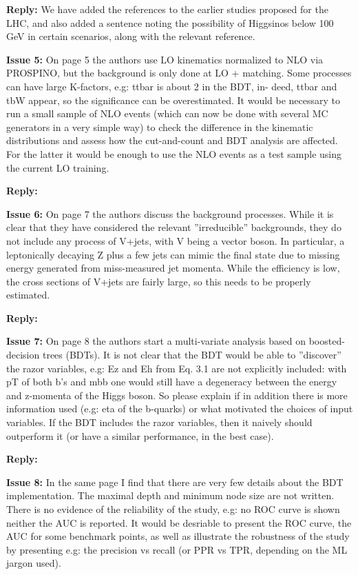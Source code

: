 \documentclass[12pt]{article}
\newcommand{\issue}[1]{\bigskip\noindent\textbf{\color{Maroon}Issue #1: }}
\newcommand{\reply}{\medskip\noindent\textbf{\color{RoyalBlue}Reply:}}
\begin{document}
\reply{} We have added the references to the earlier studies proposed for the
LHC, and also added a sentence noting the possibility of Higgsinos below 100
GeV in certain scenarios, along with the relevant reference.

\issue{5} On page 5 the authors use LO kinematics normalized
to NLO via PROSPINO, but the background is only done at LO + matching. Some
processes can have large K-factors, e.g: ttbar is about 2 in the BDT, in- deed,
ttbar and tbW appear, so the significance can be overestimated. It would be
necessary to run a small sample of NLO events (which can now be done with
several MC generators in a very simple way) to check the difference in the
kinematic distributions and assess how the cut-and-count and BDT analysis are
affected. For the latter it would be enough to use the NLO events as a test
sample using the current LO training.

\reply{} 

\issue{6} On page 7 the authors discuss the background
processes. While it is clear that they have considered the relevant
”irreducible” backgrounds, they do not include any process of V+jets, with V
being a vector boson. In particular, a leptonically decaying Z plus a few jets
can mimic the final state due to missing energy generated from miss-measured
jet momenta. While the efficiency is low, the cross sections of V+jets are
fairly large, so this needs to be properly estimated.

\reply{} 

\issue{7} On page 8 the authors start a multi-variate analysis
based on boosted- decision trees (BDTs). It is not clear that the BDT would be
able to ”discover” the razor variables, e.g: Ez and Eh from Eq. 3.1 are not
explicitly included: with pT of both b’s and mbb one would still have a
degeneracy between the energy and z-momenta of the Higgs boson. So please
explain if in addition there is more information used (e.g: eta of the
b-quarks) or what motivated the choices of input variables. If the BDT includes
the razor variables, then it naively should outperform it (or have a similar
performance, in the best case).

\reply{} 

\issue{8} In the same page I find that there are very few details
about the BDT implementation. The maximal depth and minimum node size are not
written. There is no evidence of the reliability of the study, e.g: no ROC
curve is shown neither the AUC is reported. It would be desriable to present
the ROC curve, the AUC for some benchmark points, as well as illustrate the
robustness of the study by presenting e.g: the precision vs recall (or PPR vs
TPR, depending on the ML jargon used).
\end{document}
